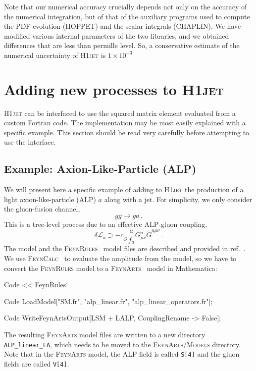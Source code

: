 \documentclass[12pt]{article}
\begin{document}
Note that our numerical accuracy crucially depends not only on the
accuracy of the numerical integration, but of that of the auxiliary
programs used to compute the PDF evolution (\textsc{HOPPET}) and the
scalar integrals (\textsc{CHAPLIN}). We have modified various internal
parameters of the two libraries, and we obtained differences that are
less than permille level. So, a conservative estimate of the numerical
uncertainty of \textsc{H1jet} is $1\times 10^{-3}$

\section{Adding new processes to \textsc{H1jet}}
\label{sec:newprocs} 
\textsc{H1jet} can be interfaced to use the squared matrix element
evaluated from a custom Fortran code. The implementation may be most
easily explained with a specific example. This section should be read very 
carefully before attempting to use the interface.

\subsection{Example: Axion-Like-Particle (ALP)}
We will present here a specific example of adding to \textsc{H1jet}
the production of a light axion-like-particle (ALP) $a$ along with a
jet. For simplicity, we only consider the gluon-fusion channel,
\begin{equation}
    g g \rightarrow g a \,. 
\end{equation}
This is a tree-level process due to an effective ALP-gluon coupling, 
\begin{equation}
   \delta \mathcal{L}_a \supset -c_{\tilde{G}}\frac{a}{f_a} G_{\mu\nu}^{a} \tilde{G}^{a \mu\nu} \,. \label{eq:ggacoupling}
\end{equation}
The model and the \textsc{FeynRules}~\cite{Alloul:2013bka} model files
are described and provided in ref.~\cite{Brivio:2017ije}. We use
\textsc{FeynCalc}~\cite{Mertig:1990an,Shtabovenko:2016sxi,Shtabovenko:2020gxv}
to evaluate the amplitude from the model, so we have to convert
the \textsc{FeynRules} model to a \textsc{FeynArts}~\cite{Hahn:2000kx}
model in Mathematica:
\begin{mmaCell}{Code}
<< FeynRules` 
\end{mmaCell}
\begin{mmaCell}{Code}
LoadModel["SM.fr", "alp_linear.fr", "alp_linear_operators.fr"];  
\end{mmaCell}
\begin{mmaCell}{Code}
WriteFeynArtsOutput[LSM + LALP, CouplingRename -> False]; 
\end{mmaCell}
The resulting \textsc{FeynArts} model files are written to a new directory \texttt{ALP\_linear\_FA}, which needs to be moved to the \textsc{FeynArts/Models} directory. Note that in the \textsc{FeynArts} model, the ALP field is called \texttt{S[4]} and the gluon fields are called \texttt{V[4]}. 
\end{document}

